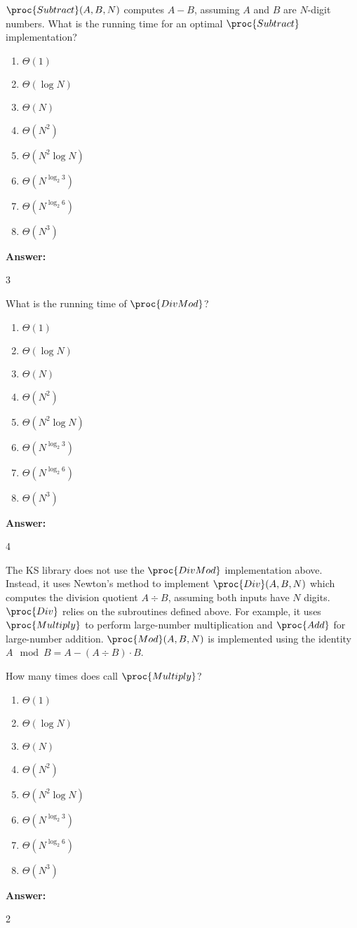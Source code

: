 \documentclass[12pt,twoside]{article}
\newcommand{\answer}{
 \par\medskip
 \textbf{Answer:}
}
\newcommand{\answerIh}{ \answer
3
}
\newcommand{\answerIi}{ \answer
4
}
\newcommand{\answerIj}{ \answer
2
}
\begin{document}
\begin{problems}
\begin{problemparts}
\problempart {} $\proc{Subtract}(A, B, N)$ computes $A - B$, assuming
$A$ and $B$ are $N$-digit numbers. What is the running time for an optimal
$\proc{Subtract}$ implementation?
\begin{enumerate}
  \item $\Theta(1)$
  \item $\Theta(\log N)$
  \item $\Theta(N)$
  \item $\Theta(N^2)$
  \item $\Theta(N^2 \log N)$
  \item $\Theta(N^{\log_2 3})$
  \item $\Theta(N^{\log_2 6})$
  \item $\Theta(N^3)$
\end{enumerate}
\answerIh

\problempart {} What is the running time of $\proc{DivMod}$?
\begin{enumerate}
  \item $\Theta(1)$
  \item $\Theta(\log N)$
  \item $\Theta(N)$
  \item $\Theta(N^2)$
  \item $\Theta(N^2 \log N)$
  \item $\Theta(N^{\log_2 3})$
  \item $\Theta(N^{\log_2 6})$
  \item $\Theta(N^3)$
\end{enumerate}
\answerIi

\end{problemparts}

The KS library does not use the $\proc{DivMod}$ implementation above. Instead,
it uses Newton's method to implement $\proc{Div}(A, B, N)$ which computes the
division quotient $A \div B$, assuming both inputs have $N$ digits. $\proc{Div}$
relies on the subroutines defined above. For example, it uses $\proc{Multiply}$
to perform large-number multiplication and $\proc{Add}$ for large-number
addition. $\proc{Mod}(A, B, N)$ is implemented using the identity $A \mod B = A
- (A \div B) \cdot B$.

\begin{problemparts}

\problempart {} How many times does  call $\proc{Multiply}$?
\begin{enumerate}
  \item $\Theta(1)$
  \item $\Theta(\log N)$
  \item $\Theta(N)$
  \item $\Theta(N^2)$
  \item $\Theta(N^2 \log N)$
  \item $\Theta(N^{\log_2 3})$
  \item $\Theta(N^{\log_2 6})$
  \item $\Theta(N^3)$
\end{enumerate}
\answerIj


\end{problemparts}
\end{problems}
\end{document}

